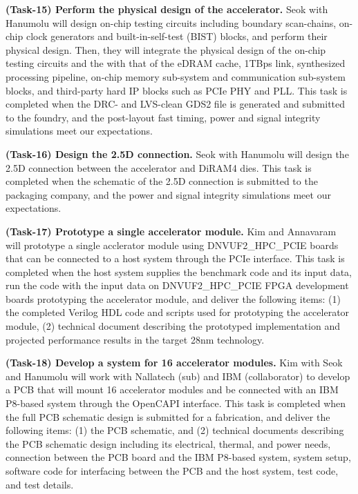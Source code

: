 \noindent
\textbf{(Task-15) Perform the physical design of the accelerator.} 
Seok with Hanumolu will design on-chip testing circuits including boundary scan-chains, on-chip clock generators and built-in-self-test (BIST) blocks, and perform their physical design.
Then, they will integrate the physical design of the on-chip testing circuits and the with that of the eDRAM cache, 1TBps link, synthesized processing pipeline, on-chip memory sub-system and communication sub-system blocks, and third-party hard IP blocks such as PCIe PHY and PLL.
This task is completed when the DRC- and LVS-clean GDS2 file is generated and submitted to the foundry, and the post-layout fast timing, power and signal integrity simulations meet our expectations.


\noindent
\textbf{(Task-16) Design the 2.5D connection.} 
Seok with Hanumolu will design the 2.5D connection between the accelerator and DiRAM4 dies.
This task is completed when the schematic of the 2.5D connection is submitted to the packaging company, and the power and signal integrity simulations meet our expectations.


\noindent
\textbf{(Task-17) Prototype a single accelerator module.}
Kim and Annavaram will prototype a single acclerator module using DNVUF2_HPC_PCIE boards that can be connected to a host system through the PCIe interface.
This task is completed when the host system supplies the benchmark code and its input data, run the code with the input data on DNVUF2_HPC_PCIE FPGA development boards prototyping the accelerator module, and deliver the following items:
(1) the completed Verilog HDL code and scripts used for prototyping the accelerator module,  
(2) technical document describing the prototyped implementation and projected performance results in the target 28nm technology.


\noindent
\textbf{(Task-18) Develop a system for 16 accelerator modules.}
Kim with Seok and Hanumolu will work with Nallatech (sub) and IBM (collaborator) to develop a PCB that will mount 16 accelerator modules and be connected with an IBM P8-based system through the OpenCAPI interface.
This task is completed when the full PCB schematic design is submitted for a fabrication, and deliver the following items:
(1) the PCB schematic, and
(2) technical documents describing the PCB schematic design including its electrical, thermal, and power needs, connection between the PCB board and the IBM P8-based system, 
system setup, software code for interfacing between the PCB and the host system, test code, and test details. 


